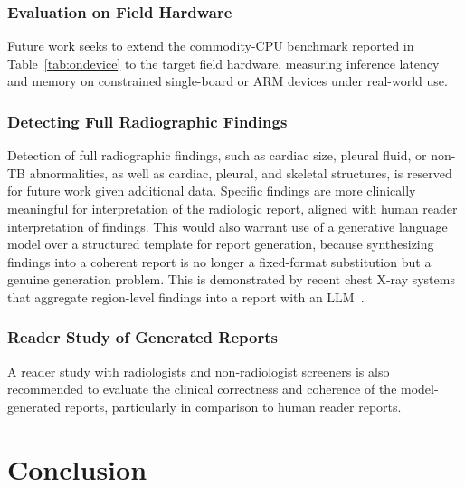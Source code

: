 \documentclass[conference, letterpaper]{IEEEtran}
\begin{document}
\subsubsection{Evaluation on Field Hardware}

Future work seeks to extend the commodity-CPU benchmark reported in Table~\ref{tab:ondevice} to the target field hardware, measuring inference latency and memory on constrained single-board or ARM devices under real-world use.

\subsubsection{Detecting Full Radiographic Findings}

Detection of full radiographic findings, such as cardiac size, pleural fluid, or non-TB abnormalities, as well as cardiac, pleural, and skeletal structures, is reserved for future work given additional data. Specific findings are more clinically meaningful for interpretation of the radiologic report, aligned with human reader interpretation of findings. This would also warrant use of a generative language model over a structured template for report generation, because synthesizing findings into a coherent report is no longer a fixed-format substitution but a genuine generation problem. This is demonstrated by recent chest X-ray systems that aggregate region-level findings into a report with an LLM~\cite{siemens_llm_cxr_2023, noh2026hybrid}.

\subsubsection{Reader Study of Generated Reports}

A reader study with radiologists and non-radiologist screeners is also recommended to evaluate the clinical correctness and coherence of the model-generated reports, particularly in comparison to human reader reports.

\section{Conclusion}
\end{document}
